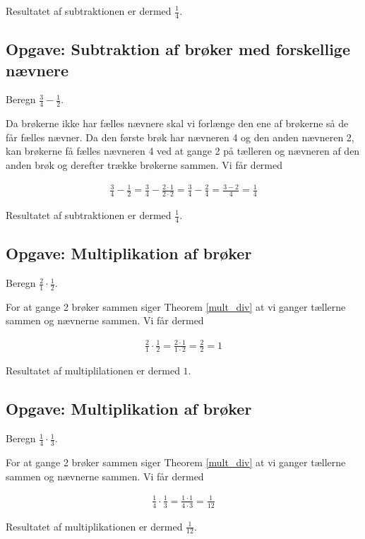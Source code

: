 Resultatet af subtraktionen er dermed $\frac{1}{4}$.

\subsection{Opgave: Subtraktion af brøker med forskellige nævnere}
Beregn $\frac{3}{4} - \frac{1}{2}$.

Da brøkerne ikke har fælles nævnere skal vi forlænge den ene af brøkerne så de får fælles nævner. Da den første brøk har nævneren 4 og den anden nævneren 2, kan brøkerne få fælles nævneren 4 ved at gange 2 på tælleren og nævneren af den anden brøk og derefter trække brøkerne sammen. Vi får dermed

\begin{align*}
\frac{3}{4} - \frac{1}{2} = \frac{3}{4} - \frac{2\cdot 1}{2\cdot 2} = \frac{3}{4} - \frac{2}{4} = \frac{3-2}{4} = \frac{1}{4}
\end{align*}

Resultatet af subtraktionen er dermed $\frac{1}{4}$.

\subsection{Opgave: Multiplikation af brøker}
Beregn $\frac{2}{1}\cdot \frac{1}{2}$.

For at gange 2 brøker sammen siger Theorem \ref{mult_div} at vi ganger tællerne sammen og nævnerne sammen. Vi får dermed

\begin{align*}
\frac{2}{1}\cdot \frac{1}{2} = \frac{2\cdot 1}{1\cdot 2} = \frac{2}{2} = 1
\end{align*}

Resultatet af multiplilationen er dermed $1$.

\subsection{Opgave: Multiplikation af brøker}
Beregn $\frac{1}{4}\cdot \frac{1}{3}$.

For at gange 2 brøker sammen siger Theorem \ref{mult_div} at vi ganger tællerne sammen og nævnerne sammen. Vi får dermed

\begin{align*}
\frac{1}{4}\cdot \frac{1}{3} = \frac{1\cdot 1}{4\cdot 3} = \frac{1}{12}
\end{align*}

Resultatet af multiplikationen er dermed $\frac{1}{12}$.

